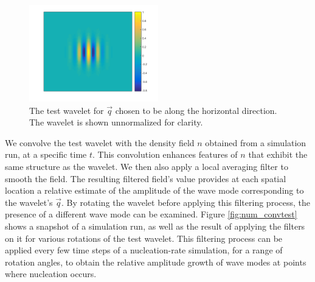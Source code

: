 \begin{figure}[h]
\centering
\includegraphics[width=0.5\textwidth]{fig_num/testWavelet.png}
\caption{The test wavelet for $\vec{q}$ chosen to be along the horizontal direction. The wavelet is shown unnormalized for clarity.}\label{fig:num_testWavelet}
\end{figure}

We convolve the test wavelet with the density field $n$ obtained from a simulation run, at a specific time $t$. This convolution enhances features of $n$ that exhibit the same structure as the wavelet. We then also apply a local averaging filter to smooth the field. The resulting filtered field's value provides at each spatial location a relative estimate of the amplitude of the wave mode corresponding to the wavelet's $\vec{q}$. By rotating the wavelet before applying this filtering process, the presence of a different wave mode can be examined. Figure \ref{fig:num_convtest} shows a snapshot of a simulation run, as well as the result of applying the filters on it for various rotations of the test wavelet. This filtering process can be applied every few time steps of a nucleation-rate simulation, for a range of rotation angles, to obtain the relative amplitude growth of wave modes at points where nucleation occurs.

